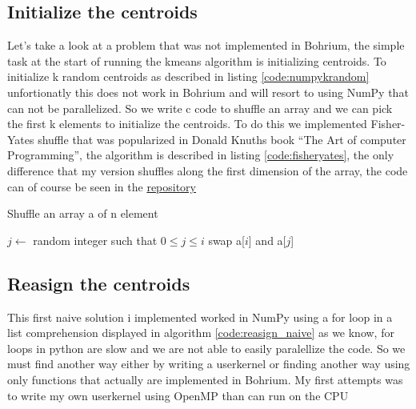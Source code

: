 \documentclass[12pt]{report}
\begin{document}
\subsection{Initialize the centroids}
\label{subsec:userkernel}
Let's take a look at a problem that was not implemented in Bohrium, the simple task at the start of running the kmeans algorithm is initializing centroids. To initialize k random centroids as described in listing \ref{code:numpykrandom} unfortionatly this does not work in Bohrium and will resort to using NumPy that can not be parallelized. So we write c code to shuffle an array and we can pick the first k elements to initialize the centroids. To do this we implemented Fisher-Yates shuffle that was popularized in Donald Knuths book ``The Art of computer Programming'', the algorithm is described in listing \ref{code:fisheryates}, the only difference that my version shuffles along the first dimension of the array, the code can of course be seen in the \href{https://github.com/shadesfear/bachelor}{repository}

\begin{algorithm}
  \caption{Shuffle an array a of n element}
  \label{code:fisheryates}
  \begin{algorithmic}[1]
    \State $j \gets$ random integer such that $0\leq j \leq i$
    \State swap a[$i$] and a[$j$]
    \EndFor
    \EndProcedure
  \end{algorithmic}
\end{algorithm}

\subsection{Reasign the centroids}
\label{subsec:reasign}
This first naive solution i implemented worked in NumPy using a for loop in a list comprehension displayed in algorithm \ref{code:reasign_naive} as we know, for loops in python are slow and we are not able to easily paralellize the code. So we must find another way either by writing a userkernel or finding another way using only functions that actually are implemented in Bohrium. My first attempts was to write my own userkernel using OpenMP than can run on the CPU \\

\end{document}
